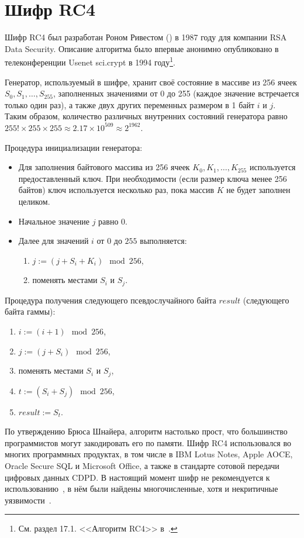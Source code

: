 \section{Шифр RC4}\label{rc4}

Шифр RC4 был разработан Роном Ривестом () в 1987 году для компании RSA Data Security. Описание алгоритма было впервые анонимно опубликовано в телеконференции Usenet sci.crypt в 1994 году\footnote{См. раздел 17.1. <<Алгоритм RC4>> в~\cite{Schneier:2002}.}.

Генератор, используемый в шифре, хранит своё состояние в массиве из 256 ячеек $S_0, S_1, \dots, S_{255}$, заполненных значениями от 0 до 255 (каждое значение встречается только один раз), а также двух других переменных размером в 1 байт $i$ и $j$. Таким образом, количество различных внутренних состояний генератора равно $255! \times 255 \times 255 \approx 2.17 \times 10^{509} \approx 2^{1962}$.

Процедура инициализации генератора:
\begin{itemize}
	\item Для заполнения байтового массива из 256 ячеек $K_0, K_1, \dots, K_{255}$ используется предоставленный ключ. При необходимости (если размер ключа менее 256 байтов) ключ используется несколько раз, пока массив $K$ не будет заполнен целиком.
	\item Начальное значение $j$ равно $0$.
	\item Далее для значений $i$ от $0$ до $255$ выполняется:
	\begin{enumerate}
		\item $j:= (j + S_i + K_i) \mod 256$,
		\item поменять местами $S_i$ и $S_j$.
	\end{enumerate}
\end{itemize}

Процедура получения следующего псевдослучайного байта $result$ (следующего байта гаммы):
\begin{enumerate}
	\item $ i := (i + 1) \mod 256$,
	\item $ j := (j + S_i) \mod 256$,
	\item поменять местами $S_i$ и $S_j$,
	\item $ t := ( S_i + S_j ) \mod 256$,
	\item $ result := S_t$.
\end{enumerate}

По утверждению Брюса Шнайера, алгоритм настолько прост, что большинство программистов могут закодировать его по памяти. Шифр RC4 использовался во многих программных продуктах, в том числе в IBM Lotus Notes, Apple AOCE, Oracle Secure SQL и Microsoft Office, а также в стандарте сотовой передачи цифровых данных CDPD. В настоящий момент шифр не рекомендуется к использованию~\cite{rfc7465}, в нём были найдены многочисленные, хотя и некритичные уязвимости~\cite{Fluhrer:Mantin:Shamir:2001,Mantin:Shamir:2002,Paul:Maitra:2007,Sepehrdad:Vaudenay:Vuagnoux:2011}.

